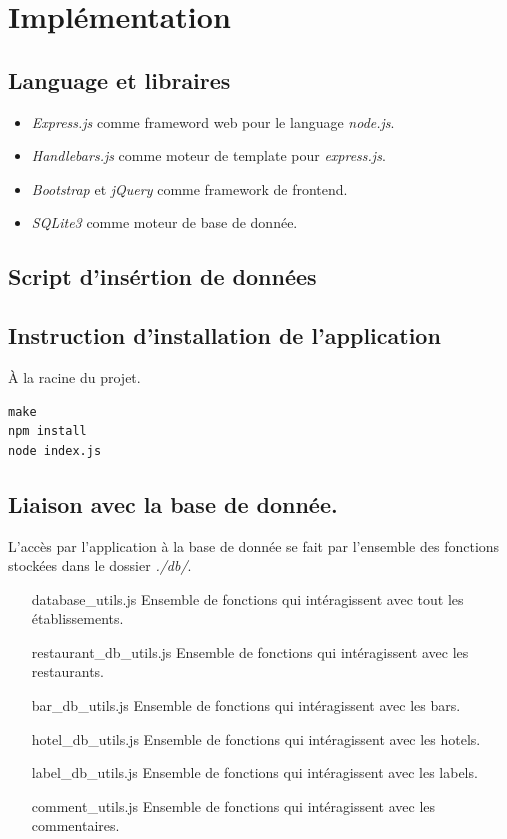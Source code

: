 \documentclass[a4paper,10pt]{article}
\begin{document}

\section{Implémentation}
\subsection{Language et libraires}
\begin{itemize}
    \item \emph{Express.js} comme frameword web pour le language \emph{node.js}.
    \item \emph{Handlebars.js} comme moteur de template pour \emph{express.js}.
    \item \emph{Bootstrap} et \emph{jQuery} comme framework de frontend.
    \item \emph{SQLite3} comme moteur de base de donnée.
\end{itemize}

\subsection{Script d'insértion de données}
    
    \pagebreak

\subsection{Instruction d'installation de l'application}
À la racine du projet.
\begin{lstlisting}
make
npm install
node index.js
\end{lstlisting}

\subsection{Liaison avec la base de donnée.}
L'accès par l'application à la base de donnée se fait par l'ensemble des
fonctions stockées dans le dossier \emph{./db/}.
\begin{itemize}
    \item [database\_utils.js] Ensemble de fonctions qui intéragissent avec tout les
        établissements.
    \item [restaurant\_db\_utils.js] Ensemble de fonctions qui intéragissent
        avec les restaurants.
    \item [bar\_db\_utils.js] Ensemble de fonctions qui intéragissent avec les
        bars.
    \item [hotel\_db\_utils.js] Ensemble de fonctions qui intéragissent avec
        les hotels.
    \item [label\_db\_utils.js] Ensemble de fonctions qui intéragissent avec
        les labels.
    \item [comment\_utils.js] Ensemble de fonctions qui intéragissent avec
        les commentaires.
\end{itemize}
\end{document}
